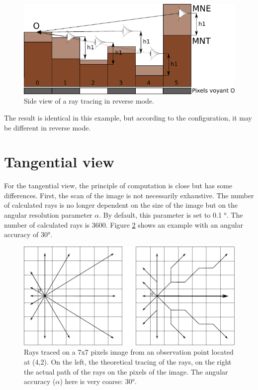 \documentclass{report}
\begin{document}
\begin{figure}[H]
	\includegraphics{img/ray_side_inverse-fr.pdf} 
	\caption{Side view of a ray tracing in reverse mode.}
	\label{ray_side_inverse}
\end{figure}

The result is identical in this example, but according to the configuration, it may be different in reverse mode.

\section{Tangential view}
\label{principles_tan}
For the tangential view, the principle of computation is close but has some differences. First, the scan of the image is not necessarily exhaustive. The number of calculated rays is no longer dependent on the size of the image but on the angular resolution parameter $\alpha$. By default, this parameter is set to 0.1 °. The number of calculated rays is 3600. Figure \ref{grid_tan} shows an example with an angular accuracy of 30°.

\begin{figure}[H]
	\includegraphics[scale=0.8]{img/grid_tan.pdf} 
	\caption{Rays traced on a 7x7 pixels image from an observation point located at (4,2). On the left, the theoretical tracing of the rays, on the right the actual path of the rays on the pixels of the image. The angular accuracy ($\alpha$) here is very coarse: 30°.}
	\label{grid_tan}
\end{figure}
\end{document}

